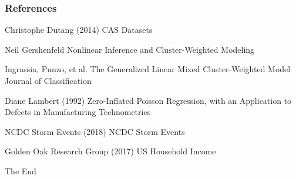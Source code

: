 \documentclass{beamer}
\begin{document}
\begin{frame}
\frametitle{References}
\footnotesize{
\begin{thebibliography}{99} %
 Christophe Dutang (2014)
\newblock CAS Datasets 

 Neil Gershenfeld 
\newblock Nonlinear Inference and Cluster‐Weighted Modeling


 Ingrassia, Punzo, et  al. 
\newblock The Generalized Linear Mixed Cluster-Weighted Model
\newblock Journal of Classification


 Diane Lambert (1992) 
\newblock Zero-Inflated Poisson Regression, with an Application to Defects in Manufacturing 
\newblock Technometrics 

 NCDC Storm Events (2018)
\newblock NCDC Storm Events


 Golden Oak Research Group (2017)
\newblock US Household Income


\end{thebibliography}
}
\end{frame}


\begin{frame}
\Huge{\centerline{The End}}
\end{frame}

\end{document}
